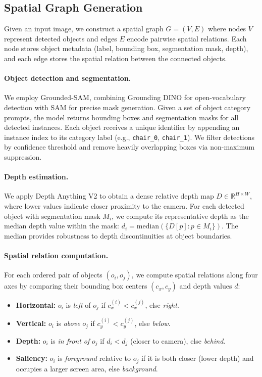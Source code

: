 \subsection{Spatial Graph Generation}

Given an input image, we construct a spatial graph $G = (V, E)$ where nodes $V$ represent detected objects and edges $E$ encode pairwise spatial relations. Each node stores object metadata (label, bounding box, segmentation mask, depth), and each edge stores the spatial relation between the connected objects.

\paragraph{Object detection and segmentation.} We employ Grounded-SAM, combining Grounding DINO for open-vocabulary detection with SAM for precise mask generation. Given a set of object category prompts, the model returns bounding boxes and segmentation masks for all detected instances. Each object receives a unique identifier by appending an instance index to its category label (e.g., \texttt{chair\_0}, \texttt{chair\_1}). We filter detections by confidence threshold and remove heavily overlapping boxes via non-maximum suppression.

\paragraph{Depth estimation.} We apply Depth Anything V2 to obtain a dense relative depth map $D \in \mathbb{R}^{H \times W}$, where lower values indicate closer proximity to the camera. For each detected object with segmentation mask $M_i$, we compute its representative depth as the median depth value within the mask: $d_i = \text{median}(\{D[p] : p \in M_i\})$. The median provides robustness to depth discontinuities at object boundaries.

\paragraph{Spatial relation computation.} For each ordered pair of objects $(o_i, o_j)$, we compute spatial relations along four axes by comparing their bounding box centers $(c_x, c_y)$ and depth values $d$:

\begin{itemize}[leftmargin=1.5em, itemsep=2pt, topsep=3pt]
    \item \textbf{Horizontal:} $o_i$ is \textit{left} of $o_j$ if $c_x^{(i)} < c_x^{(j)}$, else \textit{right}.
    \item \textbf{Vertical:} $o_i$ is \textit{above} $o_j$ if $c_y^{(i)} < c_y^{(j)}$, else \textit{below}.
    \item \textbf{Depth:} $o_i$ is \textit{in front of} $o_j$ if $d_i < d_j$ (closer to camera), else \textit{behind}.
    \item \textbf{Saliency:} $o_i$ is \textit{foreground} relative to $o_j$ if it is both closer (lower depth) and occupies a larger screen area, else \textit{background}.
\end{itemize}

